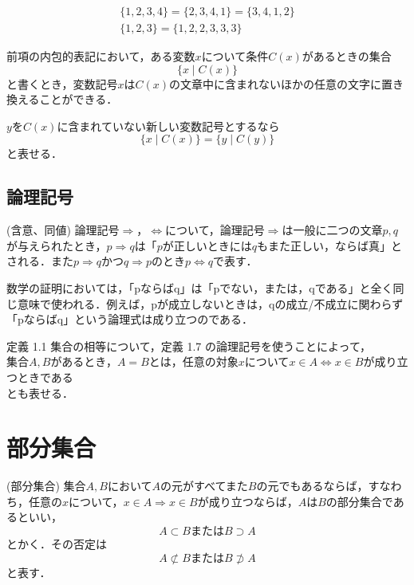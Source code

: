 \documentclass[a4j]{jsarticle}
\begin{document}
\medskip

\begin{align}
	\{1,2,3,4\} = \{2,3,4,1\} = \{3,4,1,2\}\\
	\{1,2,3\} = \{1,2,2,3,3,3\}
\end{align}

\medskip

 前項の内包的表記において，ある変数$x$について条件$C(x)$があるときの集合\[ \{ x \mid C(x)\} \]と書くとき，変数記号$x$は$C(x)$の文章中に含まれないほかの任意の文字に置き換えることができる．

\medskip

 $y$を$C(x)$に含まれていない新しい変数記号とするなら\[ \{ x \mid C(x)\} = \{ y \mid C(y)\} \]と表せる．

\subsection{論理記号}

\begin{itembox}[l]{ (含意、同値)}
論理記号$\Rightarrow$，$\Leftrightarrow$について，論理記号$\Rightarrow$は一般に二つの文章$p,q$が与えられたとき，$p \Rightarrow q$は「$p$が正しいときには$q$もまた正しい，ならば真」とされる．また$p \Rightarrow q$かつ$q \Rightarrow p$のとき$p \Leftrightarrow q$で表す．
\end{itembox}

 数学の証明においては，「pならばq」は「pでない，または，qである」と全く同じ意味で使われる．例えば，pが成立しないときは，qの成立/不成立に関わらず「pならばq」という論理式は成り立つのである．

 定義 1.1 集合の相等について，定義 1.7 の論理記号を使うことによって，\\
集合$A, B$があるとき，$A=B$とは，任意の対象$x$について$x \in A \Leftrightarrow x \in B$が成り立つときである\\
とも表せる．

\section{部分集合}

\begin{itembox}[l]{ (部分集合)}
	集合$A, B$において$A$の元がすべてまた$B$の元でもあるならば，すなわち，任意の$x$について，$x \in A \Rightarrow x \in B $が成り立つならば，$A$は$B$の部分集合であるといい，
	\begin{equation}
		A \subset B または B \supset A
	\end{equation}
	とかく．その否定は
	\begin{equation}
		A \not\subset B または B \not\supset A
	\end{equation}
	と表す．
\end{itembox}
\end{document}
